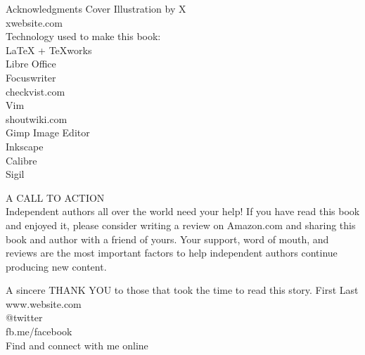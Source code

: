\newpage
\begin{vplace}[0.3]
  \thispagestyle{empty}

 \center \Huge Acknowledgments 
\bigskip
\bigskip
\bigskip
   \center \Large Cover Illustration by X \\
    \normalsize xwebsite.com \\

  \bigskip
   \bigskip
   \large Technology used to make this book: \\
  \smallskip
   \normalsize  \LaTeX  \hspace{1mm} + TeXworks \\
       Libre Office \\
    Focuswriter \\
    checkvist.com \\
     Vim \\
   shoutwiki.com \\
  Gimp Image Editor \\
  Inkscape \\
  Calibre \\
  Sigil \\


  

   
\end{vplace}

\newpage
\begin{vplace}[0.3]
  \thispagestyle{empty}
   \center \Huge A CALL TO ACTION \\
  \bigskip
  \normalsize
  Independent authors all over the world need your help! If you have read this book and enjoyed it, please consider writing a review on Amazon.com and sharing this book and author with a friend of yours. Your support, word of mouth, and reviews are the most important factors to help independent authors continue producing new content.

\bigskip
\bigskip
\bigskip

\raggedright
A sincere THANK YOU to those that took the time to read this story. 
\bigskip
\center \huge First Last \\
\bigskip
\normalsize www.website.com \\
@twitter \\
fb.me/facebook \\

\bigskip
Find and connect with me online \\



\end{vplace}
\newpage
\begin{vplace}[0.1]
 \thispagestyle{empty}


\end{vplace}